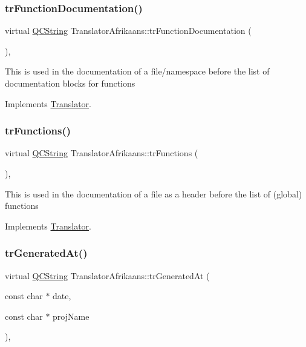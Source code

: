 \subsubsection{\texorpdfstring{trFunctionDocumentation()}{trFunctionDocumentation()}}
{\footnotesize\ttfamily virtual \mbox{\hyperlink{class_q_c_string}{Q\+C\+String}} Translator\+Afrikaans\+::tr\+Function\+Documentation (\begin{DoxyParamCaption}{ }\end{DoxyParamCaption})\hspace{0.3cm}{\ttfamily [inline]}, {\ttfamily [virtual]}}

This is used in the documentation of a file/namespace before the list of documentation blocks for functions 

Implements \mbox{\hyperlink{class_translator}{Translator}}.

\mbox{\label{class_translator_afrikaans_ae7c469041bd0aa81794c5bb4e497119b}} 
\subsubsection{\texorpdfstring{trFunctions()}{trFunctions()}}
{\footnotesize\ttfamily virtual \mbox{\hyperlink{class_q_c_string}{Q\+C\+String}} Translator\+Afrikaans\+::tr\+Functions (\begin{DoxyParamCaption}{ }\end{DoxyParamCaption})\hspace{0.3cm}{\ttfamily [inline]}, {\ttfamily [virtual]}}

This is used in the documentation of a file as a header before the list of (global) functions 

Implements \mbox{\hyperlink{class_translator}{Translator}}.

\mbox{\label{class_translator_afrikaans_a1a1e79de8eb3dcb6b5888dda0fb6edbc}} 
\subsubsection{\texorpdfstring{trGeneratedAt()}{trGeneratedAt()}}
{\footnotesize\ttfamily virtual \mbox{\hyperlink{class_q_c_string}{Q\+C\+String}} Translator\+Afrikaans\+::tr\+Generated\+At (\begin{DoxyParamCaption}\item[{const char $\ast$}]{date,  }\item[{const char $\ast$}]{proj\+Name }\end{DoxyParamCaption})\hspace{0.3cm}{\ttfamily [inline]}, {\ttfamily [virtual]}}


